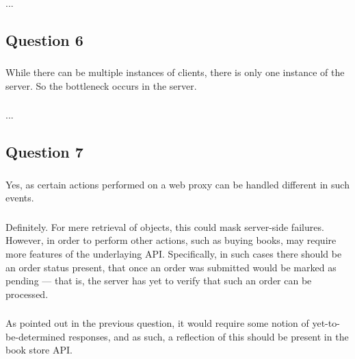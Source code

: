 \subsubsection{}
...

\subsection{Question 6}

\subsubsection{}
While there can be multiple instances of clients, there is only one instance of
the server. So the bottleneck occurs in the server.

\subsubsection{}
...

\subsection{Question 7}

\subsubsection{}
Yes, as certain actions performed on a web proxy can be handled different in
such events.

\subsubsection{}
Definitely. For mere retrieval of objects, this could mask server-side
failures. However, in order to perform other actions, such as buying books,
may require more features of the underlaying API. Specifically, in such cases
there should be an order status present, that once an order was submitted would
be marked as pending --- that is, the server has yet to verify that such an
order can be processed.

\subsubsection{}
As pointed out in the previous question, it would require some notion of
yet-to-be-determined responses, and as such, a reflection of this should be
present in the book store API.


